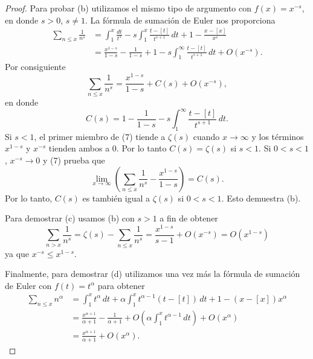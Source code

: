 \documentclass[12pt,a4paper]{book}
\begin{document}
\begin{proof}
        Para probar (b) utilizamos el mismo tipo de argumento con $f(x)=x^{-s}$, en donde
        $s>0$, $s\neq1$. La fórmula de sumación de Euler nos proporciona
        \begin{align*}
            \sum_{n\leq x}\frac{1}{n^s}&=\int_1^x\frac{dt}{t^s}-s\int_1^x\frac{t-[t]}{t^{s+1}}\,dt
            +1-\frac{x-[x]}{x^s}\\
            &=\frac{x^{1-s}}{1-s}-\frac{1}{1-s}+1-s\int_1^\infty\frac{t-[t]}{t^{s+1}}\,dt+O(x^{-s}).
        \end{align*}
        Por consiguiente
        \begin{equation}
            \sum_{n\leq x}\frac{1}{n^s}=\frac{x^{1-s}}{1-s}+C(s)+O(x^{-s}),
        \end{equation}
        en donde
        \begin{equation*}
            C(s)=1-\frac{1}{1-s}-s\int_1^\infty\frac{t-[t]}{t^{s+1}}\,dt.
        \end{equation*}
        Si $s<1$, el primer miembro de (7) tiende a $\zeta(s)$ cuando $x\to\infty$ y los
        términos $x^{1-s}$ y $x^{-s}$ tienden ambos a 0. Por lo tanto $C(s)=\zeta(s)$ si
        $s<1$. Si $0<s<1$, $x^{-s}\to0$ y (7) prueba que
        \begin{equation*}
            \lim_{x\to\infty}\left(\sum_{n\leq x}\frac{1}{n^s}-\frac{x^{1-s}}{1-s}\right)=C(s).
        \end{equation*}
        Por lo tanto, $C(s)$ es también igual a $\zeta(s)$ si $0<s<1$. Esto demuestra (b).

        Para demostrar (c) usamos (b) con $s>1$ a fin de obtener
        \begin{equation*}
            \sum_{n>x}\frac{1}{n^s}=\zeta(s)-\sum_{n\leq x}\frac{1}{n^s}=\frac{x^{1-s}}{s-1}+O(x^{-s})
            =O(x^{1-s})
        \end{equation*}
        ya que $x^{-s}\leq x^{1-s}$.

        Finalmente, para demostrar (d) utilizamos una vez más la fórmula de sumación de
        Euler con $f(t)=t^\alpha$ para obtener
        \begin{align*}
            \sum_{n\leq x}n^\alpha&=\int_1^x t^\alpha\,dt+\alpha\int_1^x t^{\alpha-1}(t-[t])\,dt
            +1-(x-[x])x^\alpha\\
            &=\frac{x^{\alpha+1}}{\alpha+1}-\frac{1}{\alpha+1}+O\left(\alpha\int_1^x t^{\alpha-1}\,dt\right)
            +O(x^\alpha)\\
            &=\frac{x^{\alpha+1}}{\alpha+1}+O(x^\alpha).
        \end{align*}
    \end{proof}
\end{document}
